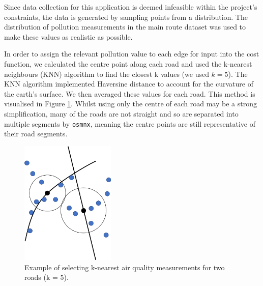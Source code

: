 \documentclass[11pt]{report}
\begin{document}

Since data collection for this application is deemed infeasible within the project's constraints, the data is generated by sampling points from a distribution. The distribution of pollution measurements in the main route dataset was used to make these values as realistic as possible.

In order to assign the relevant pollution value to each edge for input into the cost function, we calculated the centre point along each road and used the k-nearest neighbours (KNN) algorithm to find the closest k values (we used $k=5$). The KNN algorithm implemented Haversine distance to account for the curvature of the earth's surface. We then averaged these values for each road. This method is visualised in Figure \ref{fig:knn}. Whilst using only the centre of each road may be a strong simplification, many of the roads are not straight and so are separated into multiple segments by \texttt{osmnx}, meaning the centre points are still representative of their road segments.


\begin{figure}[!tb]
\centering
\includegraphics[width=0.4\textwidth]{images/knn}
\caption{Example of selecting k-nearest air quality measurements for two roads (k = 5).}
\label{fig:knn}
\end{figure}
\end{document}

